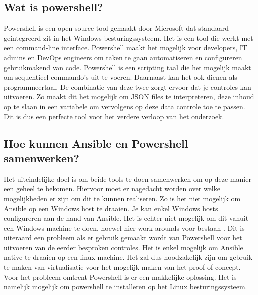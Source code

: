 \subsection{Wat is powershell?}

Powershell is een open-source tool gemaakt door Microsoft dat standaard geintegreerd zit in het Windows besturingssysteem. Het is een tool die werkt met een command-line interface. Powershell maakt het mogelijk voor developers, IT admins en DevOps engineers om taken te gaan automatiseren en configureren gebruikmakend van code. Powershell is een scripting taal die het mogelijk maakt om sequentieel commando's uit te voeren. Daarnaast kan het ook dienen als programmeertaal. De combinatie van deze twee zorgt ervoor dat je controles kan uitvoeren. Zo maakt dit het mogelijk om JSON files te interpreteren, deze inhoud op te slaan in een variabele om vervolgens op deze data controle toe te passen. Dit is dus een perfecte tool voor het verdere verloop van het onderzoek.  \autocite{BasuMallick2022}

\subsection{Hoe kunnen Ansible en Powershell samenwerken?}

Het uiteindelijke doel is om beide tools te doen samenwerken om op deze manier een geheel te bekomen. Hiervoor moet er nagedacht worden over welke mogelijkheden er zijn om dit te kunnen realiseren. Zo is het niet mogelijk om Ansible op een Windows host te draaien. Je kan enkel Windows hosts configureren aan de hand van Ansible. Het is echter niet mogelijk om dit vanuit een Windows machine te doen, hoewel hier work arounds voor bestaan . \autocite{Ansible2023} Dit is uiteraard een probleem als er gebruik gemaakt wordt van Powershell voor het uitvoeren van de eerder besproken controles. Het is enkel mogelijk om Ansible native te draaien op een linux machine. \autocite{Hat2020} Het zal dus noodzakelijk zijn om gebruik te maken van virtualisatie voor het mogelijk maken van het proof-of-concept. Voor het probleem omtrent Powershell is er een makkelijke oplossing. Het is namelijk mogelijk om powershell te installeren op het Linux besturingssysteem. \autocite{MicrosoftAnsible2023} 

